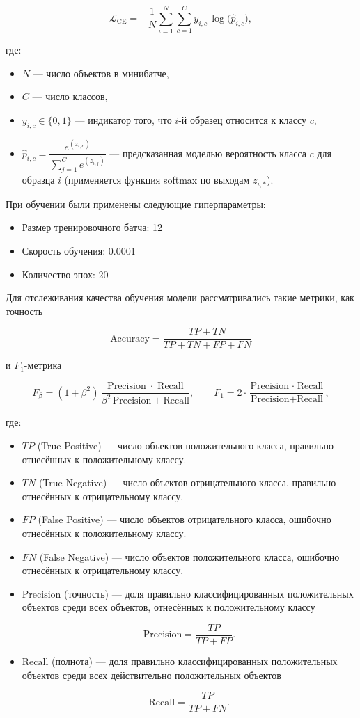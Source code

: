 $$
\mathcal{L}_{\mathrm{CE}}
= -\frac{1}{N} \sum_{i=1}^{N} \sum_{c=1}^{C} y_{i,c} \,\log\bigl(\hat{p}_{i,c}\bigr),
$$

где: 

\begin{itemize}
  \item $N$ — число объектов в минибатче,
  \item $C$ — число классов,
  \item $y_{i,c}\in\{0,1\}$ — индикатор того, что $i$-й образец относится к классу $c$,
  \item $\hat{p}_{i,c}=\dfrac{e^{(z_{i,c})}}{\sum_{j=1}^Ce^{(z_{i,j})}}$ — предсказанная моделью вероятность класса $c$ для образца $i$ (применяется функция softmax по выходам $z_{i,*}$).
\end{itemize}

При обучении были применены следующие гиперпараметры:

\begin{itemize}
    \item Размер тренировочного батча: 12
    \item Скорость обучения: 0.0001
    \item Количество эпох: 20
\end{itemize}


Для отслеживания качества обучения модели рассматривались такие метрики, как точность

$$
\text{Accuracy} = \frac{TP + TN}{TP + TN + FP + FN}
$$

и $F_1$-метрика

$$
F_\beta = (1 + \beta^2)\,\frac{\mathrm{Precision}\;\cdot\;\mathrm{Recall}}{\beta^2\,\mathrm{Precision} + \mathrm{Recall}}, \qquad  F_1 = 2 \cdot \frac{\text{Precision} \;\cdot\; \text{Recall}}{\text{Precision} + \text{Recall}},
$$

где:

\begin{itemize}
  \item $TP$ (True Positive) — число объектов положительного класса, правильно отнесённых к положительному классу.
  \item $TN$ (True Negative) — число объектов отрицательного класса, правильно отнесённых к отрицательному классу.
  \item $FP$ (False Positive) — число объектов отрицательного класса, ошибочно отнесённых к положительному классу.
  \item $FN$ (False Negative) — число объектов положительного класса, ошибочно отнесённых к отрицательному классу.
  \item $\text{Precision}$ (точность) — доля правильно классифицированных положительных объектов среди всех объектов, отнесённых к положительному классу

    $$
    \text{Precision} = \frac{TP}{TP + FP}.
    $$
  
  \item $\text{Recall}$ (полнота) — доля правильно классифицированных положительных объектов среди всех действительно положительных объектов

    $$
    \text{Recall} = \frac{TP}{TP + FN}.
    $$
\end{itemize}

